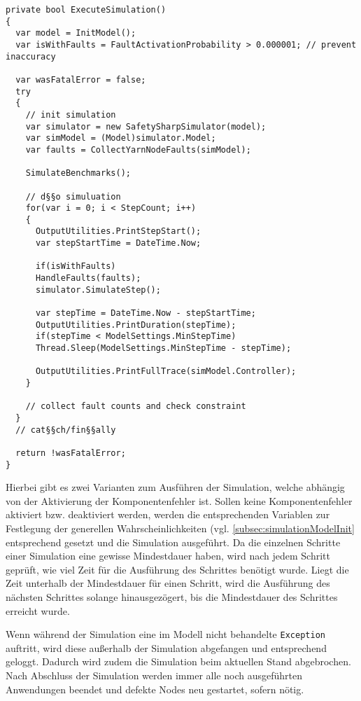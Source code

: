 \begin{lstlisting}[label=lst:hadoopSimulation,style=cs,
caption={[Simulation in dieser Fallstudie]
    Simulation in dieser Fallstudie (gekürzt).}]
private bool ExecuteSimulation()
{
  var model = InitModel();
  var isWithFaults = FaultActivationProbability > 0.000001; // prevent inaccuracy
  
  var wasFatalError = false;
  try
  {
    // init simulation
    var simulator = new SafetySharpSimulator(model);
    var simModel = (Model)simulator.Model;
    var faults = CollectYarnNodeFaults(simModel);
    
    SimulateBenchmarks();
    
    // d§§o simuluation
    for(var i = 0; i < StepCount; i++)
    {
      OutputUtilities.PrintStepStart();
      var stepStartTime = DateTime.Now;
      
      if(isWithFaults)
      HandleFaults(faults);
      simulator.SimulateStep();
      
      var stepTime = DateTime.Now - stepStartTime;
      OutputUtilities.PrintDuration(stepTime);
      if(stepTime < ModelSettings.MinStepTime)
      Thread.Sleep(ModelSettings.MinStepTime - stepTime);
      
      OutputUtilities.PrintFullTrace(simModel.Controller);
    }
    
    // collect fault counts and check constraint
  }
  // cat§§ch/fin§§ally
  
  return !wasFatalError;
}
\end{lstlisting}

Hierbei gibt es zwei Varianten zum Ausführen der Simulation, welche abhängig von der Aktivierung der Komponentenfehler ist.
Sollen keine Komponentenfehler aktiviert bzw. deaktiviert werden, werden die entsprechenden Variablen zur Festlegung der generellen Wahrscheinlichkeiten (vgl. \cref{subsec:simulationModelInit} entsprechend gesetzt und die Simulation ausgeführt.
Da die einzelnen Schritte einer Simulation eine gewisse Mindestdauer haben, wird nach jedem Schritt geprüft, wie viel Zeit für die Ausführung des Schrittes benötigt wurde.
Liegt die Zeit unterhalb der Mindestdauer für einen Schritt, wird die Ausführung des nächsten Schrittes solange hinausgezögert, bis die Mindestdauer des Schrittes erreicht wurde.

Wenn während der Simulation eine im Modell nicht behandelte \texttt{Exception} auftritt, wird diese außerhalb der Simulation abgefangen und entsprechend geloggt.
Dadurch wird zudem die Simulation beim aktuellen Stand abgebrochen.
Nach Abschluss der Simulation werden immer alle noch ausgeführten Anwendungen beendet und defekte Nodes neu gestartet, sofern nötig.

